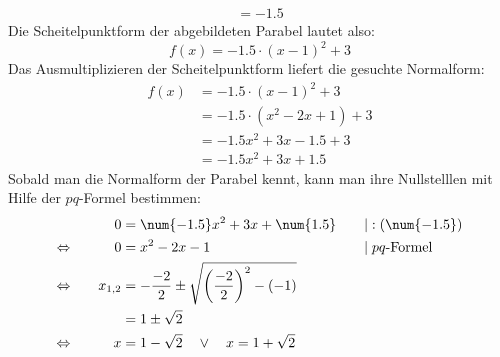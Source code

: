 \begin{exercise}
\begin{equation*}
\begin{split}
        =\num{-1.5}
      \end{split}
    \end{equation*}
    Die Scheitelpunktform der abgebildeten Parabel
    lautet also:
    \begin{equation*}
      f(x)=\num{-1.5}\cdot(x-1)^2+3
    \end{equation*}
    Das Ausmultiplizieren der Scheitelpunktform
    liefert die gesuchte Normalform:
    \begin{equation*}
      \begin{split}
        f(x)&=\num{-1.5}\cdot(x-1)^2+3\\
            &=\num{-1.5}\cdot(x^2-2x+1)+3\\
            &=\num{-1.5}x^2+3x-\num{1.5}+3\\
            &=\num{-1.5}x^2+3x+\num{1.5}
      \end{split}
    \end{equation*}
    Sobald man die Normalform der Parabel kennt,
    kann man ihre Nullstelllen mit Hilfe der
    $pq$-Formel bestimmen:
    \begin{alignat*}{3}
      \relax&\quad
      &
      0&=\num{-1.5}x^2+3x+\num{1.5}
      &
      \quad&|:(\num{-1.5})
      \\
      \Leftrightarrow&\quad
      &
      0&=x^2-2x-1
      &
      \quad&|\;\text{$pq$-Formel}
      \\
      \Leftrightarrow&\quad
      &
      x_{1,2}&=-\frac{-2}{2}\pm\sqrt{\left(\frac{-2}{2}\right)^2-(-1)}
      &
      \quad&\relax
      \\
      \relax&\quad
      &
      &=1\pm\sqrt{2}
      &
      \quad&\relax
      \\
      \Leftrightarrow&\quad
      &
      x&=1-\sqrt{2}\quad\lor\quad
      x=1+\sqrt{2}
      &
      \quad&\relax
    \end{alignat*}
  \fi
\end{exercise}
